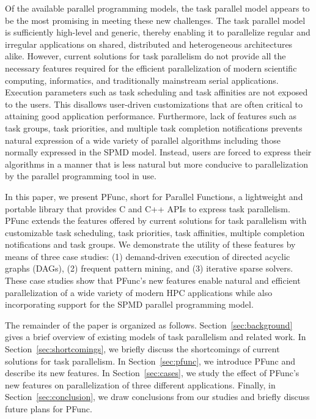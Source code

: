 \documentclass{sig-alternate}
\begin{document}
Of the available parallel programming models, the task parallel model appears
to be the most promising in meeting these new challenges.  The task parallel
model is sufficiently high-level and generic, thereby enabling it to
parallelize regular and irregular applications on shared, distributed and
heterogeneous architectures alike.  However, current solutions for task
parallelism do not provide all the necessary features required for the
efficient parallelization of modern scientific computing, informatics, and
traditionally mainstream serial applications.  Execution parameters such as
task scheduling and task affinities are not exposed to the users. This
disallows user-driven customizations that are often critical to attaining good
application performance. Furthermore, lack of features such as task groups,
task priorities, and multiple task completion notifications prevents natural
expression of a wide variety of parallel algorithms including those normally
expressed in the SPMD model. Instead, users are forced to express their
algorithms in a manner that is less natural but more conducive to
parallelization by the parallel programming tool in use.

In this paper, we present PFunc, short for Parallel Functions, a lightweight
and portable library that provides C and C++ APIs to express task parallelism.
PFunc extends the features offered by current solutions for task parallelism
with customizable task scheduling, task priorities, task affinities, multiple
completion notifications and task groups. We demonstrate the utility of these
features by means of three case studies: (1) demand-driven execution of
directed acyclic graphs (DAGs), (2) frequent pattern mining, and (3) 
iterative sparse solvers. These case studies show that PFunc's new features enable
natural and efficient parallelization of a wide variety of modern HPC 
applications while also incorporating support for the SPMD parallel programming
model.
 
The remainder of the paper is organized as follows.
Section~\ref{sec:background} gives a brief overview of existing models of task
parallelism and related work. 
% 
In Section~\ref{sec:shortcomings}, we briefly discuss the shortcomings of
current solutions for task parallelism.
%
In Section~\ref{sec:pfunc}, we introduce PFunc and describe its new features. 
%
In Section~\ref{sec:cases}, we study the effect of PFunc's new features on
parallelization of three different applications. 
%
Finally, in Section~\ref{sec:conclusion}, we draw conclusions from our studies
and briefly discuss future plans for PFunc.
\end{document}
